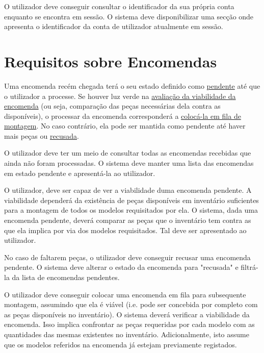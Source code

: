             {O utilizador deve conseguir consultar o identificador da sua própria conta enquanto se encontra em sessão.}
            {O sistema deve disponibilizar uma secção onde apresenta o identificador da conta de utilizador atualmente em sessão.}


    \newpage
    \section{Requisitos sobre Encomendas}

        Uma encomenda recém chegada terá o seu estado definido como \underline{pendente} até que o utilizador a processe. Se houver luz verde na \underline{avaliação da viabilidade da encomenda} (ou seja, comparação das peças necessárias dela contra as disponíveis), o processar da encomenda corresponderá a \underline{colocá-la em fila de montagem}. No caso contrário, ela pode ser mantida como pendente até haver mais peças ou \underline{recusada}. 

            {O utilizador deve ter um meio de consultar todas as encomendas recebidas que ainda não foram processadas.}
            {O sistema deve manter uma lista das encomendas em estado pendente e apresentá-la ao utilizador.}

            {O utilizador, deve ser capaz de ver a viabilidade duma encomenda pendente. A viabilidade dependerá da existência de peças disponíveis em inventário suficientes para a montagem de todos os modelos requisitados por ela.}
            {O sistema, dada uma encomenda pendente, deverá comparar as peças que o inventário tem contra as que ela implica por via dos modelos requisitados. Tal deve ser apresentado ao utilizador.}
        
            {No caso de faltarem peças, o utilizador deve conseguir recusar uma encomenda pendente.}
            {O sistema deve alterar o estado da encomenda para "recusada" e filtrá-la da lista de encomendas pendentes.}

            {O utilizador deve conseguir colocar uma encomenda em fila para subsequente montagem, assumindo que ela é viável (i.e. pode ser concebida por completo com as peças disponíveis no inventário).}
            {O sistema deverá verificar a viabilidade da encomenda. Isso implica confrontar as peças requeridas por cada modelo com as quantidades das mesmas existentes no inventário. Adicionalmente, isto assume que os modelos referidos na encomenda já estejam previamente registados.}

